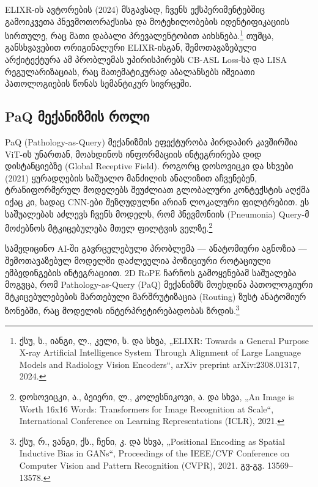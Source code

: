 \documentclass[12pt,a4paper,oneside]{report}
\begin{document}
ELIXR-ის ავტორების (2024) მსგავსად, ჩვენს ექსპერიმენტებშიც გამოიკვეთა პნევმოთორაქსისა და მოტეხილობების იდენტიფიკაციის სირთულე, რაც მათი დაბალი პრევალენტობით აიხსნება.\footnote{ქსუ, ს., იანგი, ლ., კელი, ს. და სხვა, „ELIXR: Towards a General Purpose X-ray Artificial Intelligence System Through Alignment of Large Language Models and Radiology Vision Encoders“, arXiv preprint arXiv:2308.01317, 2024.} თუმცა, განსხვავებით ორიგინალური ELIXR-ისგან, შემოთავაზებული არქიტექტურა ამ პრობლემას უპირისპირებს CB-ASL Loss-სა და LISA რეგულარიზაციას, რაც მათემატიკურად აბალანსებს იშვიათი პათოლოგიების წონას სემანტიკურ სივრცეში.

\subsection{PaQ მექანიზმის როლი}
PaQ (Pathology-as-Query) მექანიზმის ეფექტურობა პირდაპირ კავშირშია ViT-ის უნართან, მოახდინოს ინფორმაციის ინტეგრირება დიდ დისტანციებზე (Global Receptive Field). როგორც დოსოვიცკი და სხვები (2021) ყურადღების საშუალო მანძილის ანალიზით აჩვენებენ, ტრანიფორმერულ მოდელებს შეუძლიათ გლობალური კონტექსტის აღქმა იქაც კი, სადაც CNN-ები შეზღუდულნი არიან ლოკალური ფილტრებით. ეს საშუალებას აძლევს ჩვენს მოდელს, რომ პნევმონიის (Pneumonia) Query-მ მოძებნოს მტკიცებულება მთელ ფილტვის ველზე.\footnote{დოსოვიცკი, ა., ბეიერი, ლ., კოლესნიკოვი, ა. და სხვა, „An Image is Worth 16x16 Words: Transformers for Image Recognition at Scale“, International Conference on Learning Representations (ICLR), 2021.}

სამედიცინო AI-ში გავრცელებული პრობლემა — ანატომიური აგნოზია — შემოთავაზებულ მოდელში დაძლეულია პოზიციური როტაციული ემბედინგების ინტეგრაციით. 2D RoPE ჩარჩოს გამოყენებამ საშუალება მოგვცა, რომ Pathology-as-Query (PaQ) მექანიზმს მოეხდინა პათოლოგიური მტკიცებულებების მართებული მარშრუტიზაცია (Routing) ზუსტ ანატომიურ ზონებში, რაც მოდელის ინტერპრეტირებადობას ზრდის.\footnote{ქსუ, რ., ვანგი, ქს., ჩენი, კ. და სხვა, „Positional Encoding as Spatial Inductive Bias in GANs“, Proceedings of the IEEE/CVF Conference on Computer Vision and Pattern Recognition (CVPR), 2021. გვ-გვ. 13569–13578.}
\end{document}
